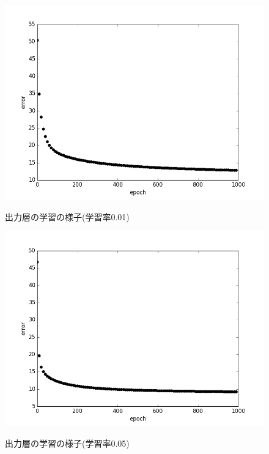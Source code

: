 \begin{figure}[]
\begin{center}
   \includegraphics[scale=0.8]{./koki/err001.png} \\
   \caption{出力層の学習の様子(学習率0.01)}
\end{center}
\end{figure}

\begin{figure}[]
\begin{center}
   \includegraphics[scale=0.8]{./koki/err005.png} \\
   \caption{出力層の学習の様子(学習率0.05)}
\end{center}
\end{figure}